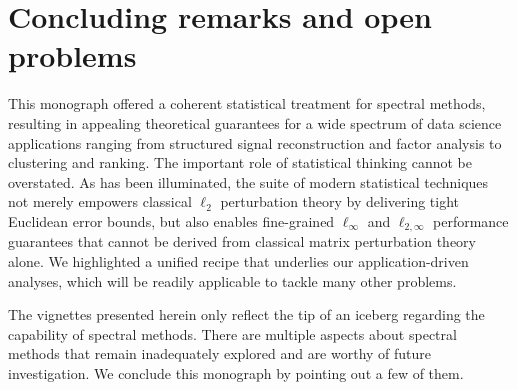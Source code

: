 \chapter{Concluding remarks and open problems}
\label{chapter:conclusion}

This monograph offered a coherent statistical treatment for spectral methods,
resulting in appealing theoretical guarantees for a wide spectrum of data science applications ranging from structured signal reconstruction and factor analysis to
clustering and ranking.
The important role of statistical thinking cannot be overstated.
As has been illuminated, the suite of modern statistical techniques not merely empowers classical $\ell_2$ perturbation theory by delivering tight Euclidean error bounds,
but also enables fine-grained $\ell_\infty$ and $\ell_{2,\infty}$ performance guarantees that cannot be derived from classical matrix perturbation theory alone.
We highlighted a unified recipe that underlies our application-driven analyses, which will be readily applicable to tackle many other problems.


The vignettes presented herein only reflect the tip of an iceberg regarding the capability of spectral methods.
There are multiple aspects about spectral methods that remain inadequately explored and are worthy of future investigation. We conclude this monograph by pointing out a few of them.



